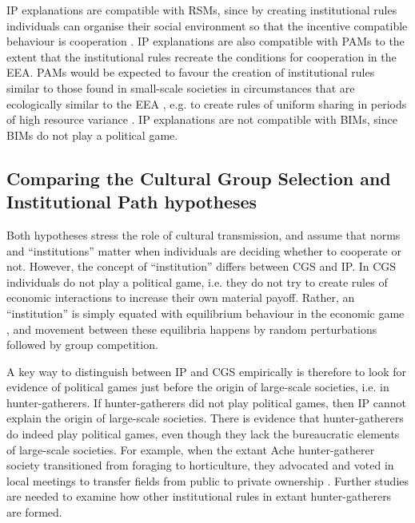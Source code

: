 \documentclass[10pt, a4paper, fleqn]{article}
\begin{document}
\begin{enumerate}
IP explanations are compatible with RSMs, since by creating institutional rules individuals can organise their social environment so that the incentive compatible behaviour is cooperation \citep{Powers:2016:a}. IP explanations are also compatible with PAMs to the extent that the institutional rules recreate the conditions for cooperation in the EEA. PAMs would be expected to favour the creation of institutional rules similar to those found in small-scale societies in circumstances that are ecologically similar to the EEA \citep{Boyer:2012:a,Petersen:2012:a,Petersen:2013:a}, e.g. to create rules of uniform sharing in periods of high resource variance \citep{Cosmides:1994:a}. IP explanations are not compatible with BIMs, since BIMs do not play a political game.



\end{enumerate}

\subsection*{Comparing the Cultural Group Selection and Institutional Path hypotheses}

Both hypotheses stress the role of cultural transmission, and assume that norms and ``institutions'' matter when individuals are deciding whether to cooperate or not. However, the concept of ``institution'' differs between CGS and IP. In CGS individuals do not play a political game, i.e. they do not try to create rules of economic interactions to increase their own material payoff. Rather, an ``institution'' is simply equated with equilibrium behaviour in the economic game \citep{Richerson:2012:a,Richerson:2016:a}, and movement between these equilibria happens by random perturbations followed by group competition. 

A key way to distinguish between IP and CGS empirically is therefore to look for evidence of political games just before the origin of large-scale societies, i.e. in hunter-gatherers. If hunter-gatherers did not play political games, then IP cannot explain the origin of large-scale societies. There is evidence that hunter-gatherers do indeed play political games, even though they lack the bureaucratic elements of large-scale societies. For example, when the extant Ache hunter-gatherer society transitioned from foraging to horticulture, they advocated and voted in local meetings to transfer fields from public to private ownership \citep{Kaplan:2005:a}. Further studies are needed to examine how other institutional rules in extant hunter-gatherers are formed.  
\end{document}
